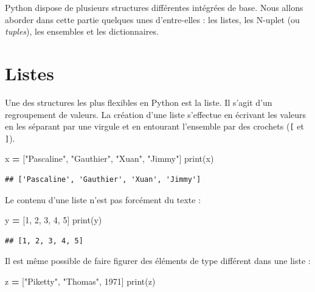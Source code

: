 \documentclass[12pt,]{book}
\newenvironment{Shaded}{\begin{snugshade}}{\end{snugshade}}
\newcommand{\DecValTok}[1]{\textcolor[rgb]{0.00,0.00,0.81}{#1}}
\newcommand{\StringTok}[1]{\textcolor[rgb]{0.31,0.60,0.02}{#1}}
\newcommand{\OperatorTok}[1]{\textcolor[rgb]{0.81,0.36,0.00}{\textbf{#1}}}
\newcommand{\BuiltInTok}[1]{#1}
\newcommand{\NormalTok}[1]{#1}
\numberwithin{equation}{section}
\numberwithin{countremarque}{section}
\begin{document}
Python dispose de plusieurs structures différentes intégrées de base.
Nous allons aborder dans cette partie quelques unes d'entre-elles : les
listes, les N-uplet (ou \emph{tuples}), les ensembles et les
dictionnaires.

\section{Listes}\label{structures-listes}

Une des structures les plus flexibles en Python est la liste. Il s'agit
d'un regroupement de valeurs. La création d'une liste s'effectue en
écrivant les valeurs en les séparant par une virgule et en entourant
l'ensemble par des crochets (\texttt{{[}} et \texttt{{]}}).

\begin{Shaded}
\begin{Highlighting}[]
\NormalTok{x }\OperatorTok{=}\NormalTok{ [}\StringTok{"Pascaline"}\NormalTok{, }\StringTok{"Gauthier"}\NormalTok{, }\StringTok{"Xuan"}\NormalTok{, }\StringTok{"Jimmy"}\NormalTok{]}
\BuiltInTok{print}\NormalTok{(x)}
\end{Highlighting}
\end{Shaded}

\begin{lstlisting}
## ['Pascaline', 'Gauthier', 'Xuan', 'Jimmy']
\end{lstlisting}

Le contenu d'une liste n'est pas forcément du texte :

\begin{Shaded}
\begin{Highlighting}[]
\NormalTok{y }\OperatorTok{=}\NormalTok{ [}\DecValTok{1}\NormalTok{, }\DecValTok{2}\NormalTok{, }\DecValTok{3}\NormalTok{, }\DecValTok{4}\NormalTok{, }\DecValTok{5}\NormalTok{]}
\BuiltInTok{print}\NormalTok{(y)}
\end{Highlighting}
\end{Shaded}

\begin{lstlisting}
## [1, 2, 3, 4, 5]
\end{lstlisting}

Il est même possible de faire figurer des éléments de type différent
dans une liste :

\begin{Shaded}
\begin{Highlighting}[]
\NormalTok{z }\OperatorTok{=}\NormalTok{ [}\StringTok{"Piketty"}\NormalTok{, }\StringTok{"Thomas"}\NormalTok{, }\DecValTok{1971}\NormalTok{]}
\BuiltInTok{print}\NormalTok{(z)}
\end{Highlighting}
\end{Shaded}
\end{document}
